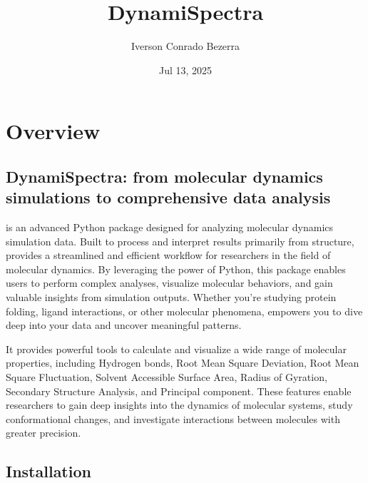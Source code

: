 \documentclass[a4paper,10pt,english]{sphinxmanual}
\title{DynamiSpectra}
\date{Jul 13, 2025}
\author{Iverson Conrado Bezerra}
\begin{document}
\pagestyle{empty}
\sphinxmaketitle
\pagestyle{plain}
\sphinxtableofcontents
\pagestyle{normal}
\label{\detokenize{index::doc}}


\sphinxstepscope


\chapter{Overview}
\label{\detokenize{Overview:overview}}\label{\detokenize{Overview::doc}}

\section{DynamiSpectra: from molecular dynamics simulations to comprehensive data analysis}
\label{\detokenize{Overview:dynamispectra-from-molecular-dynamics-simulations-to-comprehensive-data-analysis}}
\sphinxAtStartPar
{} is an advanced Python package designed for analyzing molecular dynamics simulation data. Built to process and interpret results primarily from  structure,  provides a streamlined and efficient workflow for researchers in the field of molecular dynamics. By leveraging the power of Python, this package enables users to perform complex analyses, visualize molecular behaviors, and gain valuable insights from simulation outputs. Whether you’re studying protein folding, ligand interactions, or other molecular phenomena,  empowers you to dive deep into your data and uncover meaningful patterns.

\sphinxAtStartPar
It provides powerful tools to calculate and visualize a wide range of molecular properties, including Hydrogen bonds, Root Mean Square Deviation, Root Mean Square Fluctuation, Solvent Accessible Surface Area, Radius of Gyration, Secondary Structure Analysis, and Principal component. These features enable researchers to gain deep insights into the dynamics of molecular systems, study conformational changes, and investigate interactions between molecules with greater precision.


\section{Installation}
\label{\detokenize{Overview:installation}}
\begin{sphinxVerbatim}[commandchars=\\\{\}]
  
\end{sphinxVerbatim}
\end{document}
